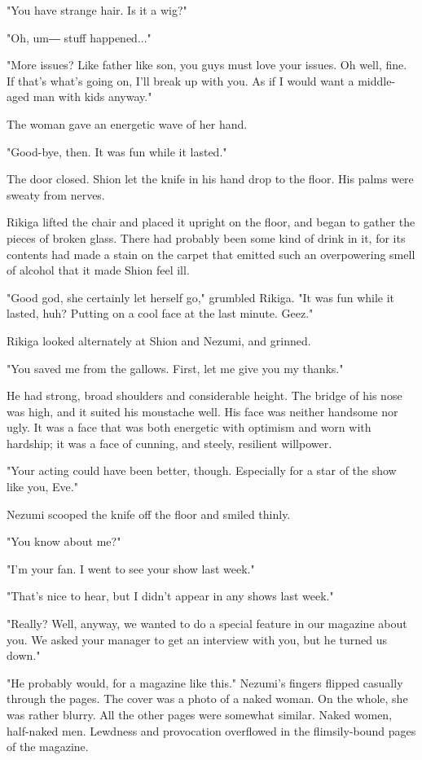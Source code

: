 "You have strange hair. Is it a wig?"

"Oh, um― stuff happened..."

"More issues? Like father like son, you guys must love your issues. Oh
well, fine. If that's what's going on, I'll break up with you. As if I
would want a middle-aged man with kids anyway."

The woman gave an energetic wave of her hand.

"Good-bye, then. It was fun while it lasted."

The door closed. Shion let the knife in his hand drop to the floor. His
palms were sweaty from nerves.

Rikiga lifted the chair and placed it upright on the floor, and began to
gather the pieces of broken glass. There had probably been some kind of
drink in it, for its contents had made a stain on the carpet that
emitted such an overpowering smell of alcohol that it made Shion feel
ill.

"Good god, she certainly let herself go," grumbled Rikiga. "It was fun
while it lasted, huh? Putting on a cool face at the last minute. Geez."

Rikiga looked alternately at Shion and Nezumi, and grinned.

"You saved me from the gallows. First, let me give you my thanks."

He had strong, broad shoulders and considerable height. The bridge of
his nose was high, and it suited his moustache well. His face was
neither handsome nor ugly. It was a face that was both energetic with
optimism and worn with hardship; it was a face of cunning, and steely,
resilient willpower.

"Your acting could have been better, though. Especially for a star of
the show like you, Eve."

Nezumi scooped the knife off the floor and smiled thinly.

"You know about me?"

"I'm your fan. I went to see your show last week."

"That's nice to hear, but I didn't appear in any shows last week."

"Really? Well, anyway, we wanted to do a special feature in our magazine
about you. We asked your manager to get an interview with you, but he
turned us down."

"He probably would, for a magazine like this." Nezumi's fingers flipped
casually through the pages. The cover was a photo of a naked woman. On
the whole, she was rather blurry. All the other pages were somewhat
similar. Naked women, half-naked men. Lewdness and provocation
overflowed in the flimsily-bound pages of the magazine.

